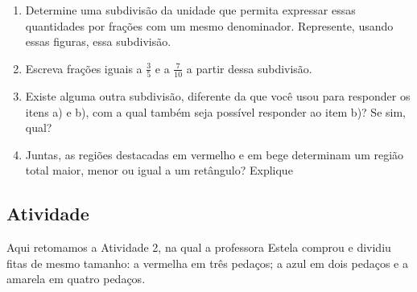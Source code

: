 \begin{center}
\end{center}

\begin{enumerate} [\quad a)] %
  \item     Determine uma subdivisão da unidade que permita expressar essas quantidades por frações com um mesmo denominador. Represente, usando essas figuras, essa subdivisão.
  \item     Escreva frações iguais a     $\frac{3}{5}$     e a     $\frac{7}{10}$     a partir dessa subdivisão.
  \item     Existe alguma outra subdivisão, diferente da que você usou para responder os itens a) e b), com a qual também seja possível responder ao item b)? Se sim, qual? 
  \item     Juntas, as regiões destacadas em vermelho e em bege determinam um região total maior, menor ou igual a um retângulo? Explique
\end{enumerate} %

\subsection{Atividade}

Aqui retomamos a Atividade 2, na qual a professora Estela comprou e dividiu fitas de mesmo tamanho: a vermelha em três pedaços; a azul em dois pedaços e a amarela em quatro pedaços. 


\begin{center}
\end{center}


